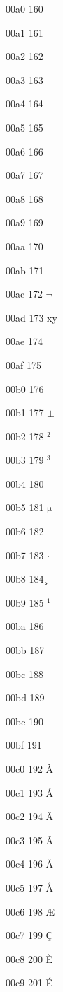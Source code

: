 \documentclass[11pt]{article}
\begin{document}
00a0 160 \ensuremath{~}

00a1 161 \textexclamdown

00a2 162 \textcent

00a3 163 \textsterling

00a4 164 \textcurrency

00a5 165 \textyen

00a6 166 \textbrokenbar

00a7 167 \textsection

00a8 168 \textasciidieresis

00a9 169 \textcopyright

00aa 170 \textordfeminine

00ab 171 \guillemotleft

00ac 172 \ensuremath{\lnot}

00ad 173 x\-y

00ae 174 \textregistered

00af 175 \textasciimacron

00b0 176 \textdegree

00b1 177 \ensuremath{\pm}

00b2 178 \ensuremath{{^2}}

00b3 179 \ensuremath{{^3}}

00b4 180 \textasciiacute

00b5 181 \ensuremath{\mathrm{\mu}}

00b6 182 \textparagraph

00b7 183 \ensuremath{\cdot}

00b8 184 \c{}

00b9 185 \ensuremath{{^1}}

00ba 186 \textordmasculine

00bb 187 \guillemotright

00bc 188 \textonequarter

00bd 189 \textonehalf

00be 190 \textthreequarters

00bf 191 \textquestiondown

00c0 192 \`A

00c1 193 \'A

00c2 194 \^A

00c3 195 \~A

00c4 196 \"A

00c5 197 \AA

00c6 198 \AE

00c7 199 \c{C}

00c8 200 \`E

00c9 201 \'E
\end{document}
